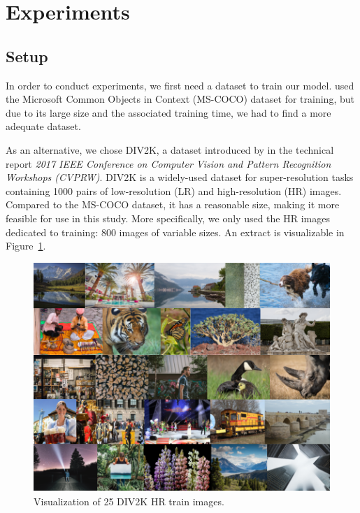 \documentclass{article}
\begin{document}
{
    \section{Experiments}
    \label{sec:experiments}

    \subsection{Setup}
    \label{subsec:setup}

    In order to conduct experiments, we first need a dataset to train our model. \cite{sr} used the Microsoft Common Objects in Context (MS-COCO) dataset \citep{mscoco} for training, but due to its large size and the associated training time, we had to find a more adequate dataset.

    As an alternative, we chose DIV2K, a dataset introduced by \cite{div2k_ds} in the technical report \textit{2017 IEEE Conference on Computer Vision and Pattern Recognition Workshops (CVPRW)}. DIV2K is a widely-used dataset for super-resolution tasks containing 1000 pairs of low-resolution (LR) and high-resolution (HR) images. Compared to the MS-COCO dataset, it has a reasonable size, making it more feasible for use in this study. More specifically, we only used the HR images dedicated to training: 800 images of variable sizes. An extract is visualizable in Figure~\ref{fig:div2k-train-og}.

    \begin{figure}[ht]
        \centering
        \includegraphics[width=\textwidth]{images/DIV2K_HR.png}
        \caption{Visualization of 25 DIV2K HR train images.}
        \label{fig:div2k-train-og}
    \end{figure}

}
\end{document}
